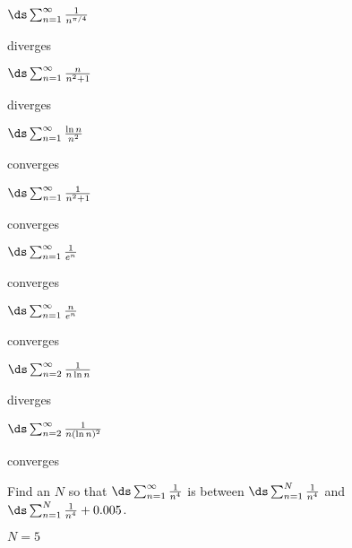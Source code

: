 \begin{theorem}
\begin{theorem}
\begin{exercises}
\twocol

\begin{exercise} $\ds\sum_{n=1}^\infty {1\over n^{\pi/4}}$
\begin{answer} diverges
\end{answer}\end{exercise}

\begin{exercise} $\ds\sum_{n=1}^\infty {n\over n^2+1}$
\begin{answer} diverges
\end{answer}\end{exercise}

\begin{exercise} $\ds\sum_{n=1}^\infty {\ln n\over n^2}$
\begin{answer} converges
\end{answer}\end{exercise}

\begin{exercise} $\ds\sum_{n=1}^\infty {1\over n^2+1}$
\begin{answer} converges
\end{answer}\end{exercise}

\begin{exercise} $\ds\sum_{n=1}^\infty {1\over e^n}$
\begin{answer} converges
\end{answer}\end{exercise}

\begin{exercise} $\ds\sum_{n=1}^\infty {n\over e^n}$
\begin{answer} converges
\end{answer}\end{exercise}

\begin{exercise} $\ds\sum_{n=2}^\infty {1\over n\ln n}$
\begin{answer} diverges
\end{answer}\end{exercise}

\begin{exercise} $\ds\sum_{n=2}^\infty {1\over n(\ln n)^2}$
\begin{answer} converges
\end{answer}\end{exercise}

\endtwocol

\msk
\begin{exercise} Find an $N$ so that
$\ds\sum_{n=1}^\infty {1\over n^4}$ is between
$\ds\sum_{n=1}^N {1\over n^4}$ and
$\ds\sum_{n=1}^N {1\over n^4} + 0.005$.
\begin{answer} $N=5$
\end{answer}\end{exercise}


\end{exercises}
\end{theorem}
\end{theorem}

